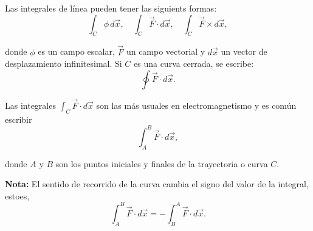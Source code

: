 Las integrales de línea pueden tener las siguients formas:
\begin{equation*}
\int_C \phi \, d\vec{x}, \quad \int_C \vec{F} \cdot d\vec{x}, \quad \int_C \vec{F} \times d\vec{x},
\end{equation*}

donde $\phi$ es un campo escalar, $\vec{F}$ un campo vectorial y $d\vec{x}$ un vector de desplazamiento infinitesimal. Si $C$ es una curva cerrada, se escribe: 
$$\oint \vec{F} \cdot d\vec{x}.$$

Las integrales $\int_C \vec{F} \cdot d\vec{x}$ son las más usuales en electromagnetismo y es común escribir
$$\int_A^B \Vec{F} \cdot d\vec{x},$$

donde $A$ y $B$ son los puntos iniciales y finales de la trayectoria o curva $C$.

\textbf{Nota:} El sentido de recorrido de la curva cambia el signo del valor de la integral, estoes,
$$\int_A^B \Vec{F} \cdot d\Vec{x} = - \int_B^A \Vec{F} \cdot d\Vec{x}. $$

